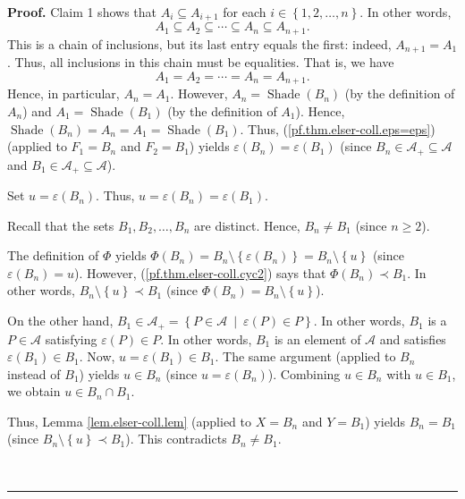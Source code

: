\documentclass[numbers=enddot,12pt,final,onecolumn]{scrartcl}%
\theoremstyle{definition}
\newenvironment{proof}[1][Proof]{\noindent\textbf{#1.} }{\ \rule{0.5em}{0.5em}}
\renewcommand{\geq}{\geqslant}
\begin{document}
\begin{proof}
Claim 1 shows that $A_{i}\subseteq A_{i+1}$ for each $i\in\left\{
1,2,\ldots,n\right\}  $. In other words,%
\[
A_{1}\subseteq A_{2}\subseteq\cdots\subseteq A_{n}\subseteq A_{n+1}.
\]
This is a chain of inclusions, but its last entry equals the first: indeed,
$A_{n+1}=A_{1}$. Thus, all inclusions in this chain must be equalities. That
is, we have%
\begin{equation}
A_{1}=A_{2}=\cdots=A_{n}=A_{n+1}. \label{pf.thm.elser-coll.c1eqs}%
\end{equation}
Hence, in particular, $A_{n}=A_{1}$. However, $A_{n}=\operatorname*{Shade}%
\left(  B_{n}\right)  $ (by the definition of $A_{n}$) and $A_{1}%
=\operatorname*{Shade}\left(  B_{1}\right)  $ (by the definition of $A_{1}$).
Hence, $\operatorname*{Shade}\left(  B_{n}\right)  =A_{n}=A_{1}%
=\operatorname*{Shade}\left(  B_{1}\right)  $. Thus,
(\ref{pf.thm.elser-coll.eps=eps}) (applied to $F_{1}=B_{n}$ and $F_{2}=B_{1}$)
yields $\varepsilon\left(  B_{n}\right)  =\varepsilon\left(  B_{1}\right)  $
(since $B_{n}\in\mathcal{A}_{+}\subseteq\mathcal{A}$ and $B_{1}\in
\mathcal{A}_{+}\subseteq\mathcal{A}$).

Set $u=\varepsilon\left(  B_{n}\right)  $. Thus, $u=\varepsilon\left(
B_{n}\right)  =\varepsilon\left(  B_{1}\right)  $.

Recall that the sets $B_{1},B_{2},\ldots,B_{n}$ are distinct. Hence,
$B_{n}\neq B_{1}$ (since $n\geq2$).

The definition of $\Phi$ yields $\Phi\left(  B_{n}\right)  =B_{n}%
\setminus\left\{  \varepsilon\left(  B_{n}\right)  \right\}  =B_{n}%
\setminus\left\{  u\right\}  $ (since $\varepsilon\left(  B_{n}\right)  =u$).
However, (\ref{pf.thm.elser-coll.cyc2}) says that $\Phi\left(  B_{n}\right)
\prec B_{1}$. In other words, $B_{n}\setminus\left\{  u\right\}  \prec B_{1}$
(since $\Phi\left(  B_{n}\right)  =B_{n}\setminus\left\{  u\right\}  $).

On the other hand, $B_{1}\in\mathcal{A}_{+}=\left\{  P\in\mathcal{A}%
\ \mid\ \varepsilon\left(  P\right)  \in P\right\}  $. In other words, $B_{1}$
is a $P\in\mathcal{A}$ satisfying $\varepsilon\left(  P\right)  \in P$. In
other words, $B_{1}$ is an element of $\mathcal{A}$ and satisfies
$\varepsilon\left(  B_{1}\right)  \in B_{1}$. Now, $u=\varepsilon\left(
B_{1}\right)  \in B_{1}$. The same argument (applied to $B_{n}$ instead of
$B_{1}$) yields $u\in B_{n}$ (since $u=\varepsilon\left(  B_{n}\right)  $).
Combining $u\in B_{n}$ with $u\in B_{1}$, we obtain $u\in B_{n}\cap B_{1}$.

Thus, Lemma \ref{lem.elser-coll.lem} (applied to $X=B_{n}$ and $Y=B_{1}$)
yields $B_{n}=B_{1}$ (since $B_{n}\setminus\left\{  u\right\}  \prec B_{1}$).
This contradicts $B_{n}\neq B_{1}$.


\end{proof}
\end{document}
